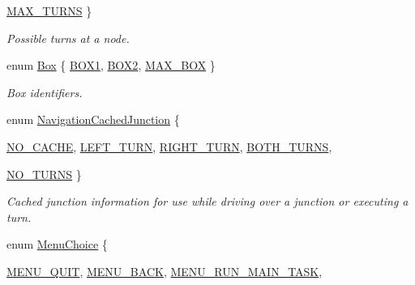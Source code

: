 \begin{DoxyCompactItemize}
\par
\hyperlink{namespaceIDP_ab8b8e9ff9f7de27da30c1fffaeef4b72a46fc0b6ab4752131480e4a05b09e1280}{MAX\_\-TURNS}
 \}
\begin{DoxyCompactList}\small\item\em Possible turns at a node. \item\end{DoxyCompactList}\item 
enum \hyperlink{namespaceIDP_ad90955841bc9492fb53b1f89cc667e18}{Box} \{ \hyperlink{namespaceIDP_ad90955841bc9492fb53b1f89cc667e18a41f638c88385a199ace07f9aab842408}{BOX1}, 
\hyperlink{namespaceIDP_ad90955841bc9492fb53b1f89cc667e18a56ba93aa81e5743059bdc8de30517883}{BOX2}, 
\hyperlink{namespaceIDP_ad90955841bc9492fb53b1f89cc667e18a097c15f1986d57076de6fbf8b02b22f3}{MAX\_\-BOX}
 \}
\begin{DoxyCompactList}\small\item\em Box identifiers. \item\end{DoxyCompactList}\item 
enum \hyperlink{namespaceIDP_a628dde0214c4c861deda405e77ad75a2}{NavigationCachedJunction} \{ \par
\hyperlink{namespaceIDP_a628dde0214c4c861deda405e77ad75a2a35431162cfca423a194c5680b2f56b4e}{NO\_\-CACHE}, 
\hyperlink{namespaceIDP_a628dde0214c4c861deda405e77ad75a2a145fe4dd7949a83a0dec44b73c2ec852}{LEFT\_\-TURN}, 
\hyperlink{namespaceIDP_a628dde0214c4c861deda405e77ad75a2a93bc5c5f7716052e0a1ae894ce62c0ea}{RIGHT\_\-TURN}, 
\hyperlink{namespaceIDP_a628dde0214c4c861deda405e77ad75a2a261d3686e8d0ca300956b91c987889db}{BOTH\_\-TURNS}, 
\par
\hyperlink{namespaceIDP_a628dde0214c4c861deda405e77ad75a2a0a75c4d06bf2d5a2b4d1c37cede78ddd}{NO\_\-TURNS}
 \}
\begin{DoxyCompactList}\small\item\em Cached junction information for use while driving over a junction or executing a turn. \item\end{DoxyCompactList}\item 
enum \hyperlink{namespaceIDP_ac1d3c3b62448912be4da9f2728f2af99}{MenuChoice} \{ \par
\hyperlink{namespaceIDP_ac1d3c3b62448912be4da9f2728f2af99a59187814038f8d9935b623e0d8b343d8}{MENU\_\-QUIT}, 
\hyperlink{namespaceIDP_ac1d3c3b62448912be4da9f2728f2af99a47d4f5eed03ea0b44b8623c8f69670d2}{MENU\_\-BACK}, 
\hyperlink{namespaceIDP_ac1d3c3b62448912be4da9f2728f2af99ab6a8ae6d050d587d31cbe4d0bf960f14}{MENU\_\-RUN\_\-MAIN\_\-TASK}, 

\end{DoxyCompactItemize}
